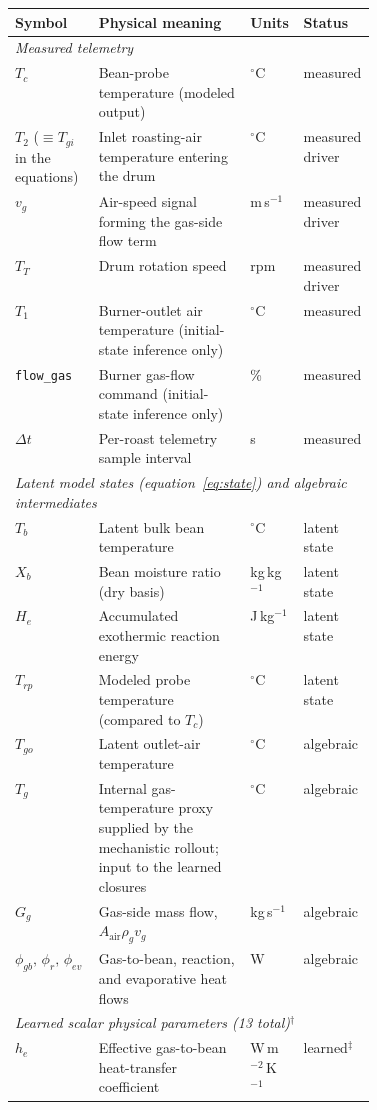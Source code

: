\documentclass[fleqn,10pt]{wlscirep}
\begin{document}
\begin{table}[!htbp]
\centering
\small
{\color{blue}
\begin{tabular}{|l|p{0.42\linewidth}|l|l|}
\hline
Symbol & Physical meaning & Units & Status \\
\hline
\multicolumn{4}{|l|}{\emph{Measured telemetry}} \\
\hline
$T_c$ & Bean-probe temperature (modeled output) & $^{\circ}$C & measured \\
$T_2$ ($\equiv T_{gi}$ in the equations) & Inlet roasting-air temperature entering the drum & $^{\circ}$C & measured driver \\
$v_g$ & Air-speed signal forming the gas-side flow term & m\,s$^{-1}$ & measured driver \\
$T_T$ & Drum rotation speed & rpm & measured driver \\
$T_1$ & Burner-outlet air temperature (initial-state inference only) & $^{\circ}$C & measured \\
\texttt{flow\_gas} & Burner gas-flow command (initial-state inference only) & \% & measured \\
$\Delta t$ & Per-roast telemetry sample interval & s & measured \\
\hline
\multicolumn{4}{|l|}{\emph{Latent model states (equation~\eqref{eq:state}) and algebraic intermediates}} \\
\hline
$T_b$ & Latent bulk bean temperature & $^{\circ}$C & latent state \\
$X_b$ & Bean moisture ratio (dry basis) & kg\,kg$^{-1}$ & latent state \\
$H_e$ & Accumulated exothermic reaction energy & J\,kg$^{-1}$ & latent state \\
$T_{rp}$ & Modeled probe temperature (compared to $T_c$) & $^{\circ}$C & latent state \\
$T_{go}$ & Latent outlet-air temperature & $^{\circ}$C & algebraic \\
$T_g$ & Internal gas-temperature proxy supplied by the mechanistic rollout; input to the learned closures & $^{\circ}$C & algebraic \\
$G_g$ & Gas-side mass flow, $A_{\mathrm{air}}\rho_g v_g$ & kg\,s$^{-1}$ & algebraic \\
$\phi_{gb},\,\phi_r,\,\phi_{ev}$ & Gas-to-bean, reaction, and evaporative heat flows & W & algebraic \\
\hline
\multicolumn{4}{|l|}{\emph{Learned scalar physical parameters (13 total)}$^{\dagger}$} \\
\hline
$h_e$ & Effective gas-to-bean heat-transfer coefficient & W\,m$^{-2}$\,K$^{-1}$ & learned$^{\ddagger}$ \\

\end{tabular}}
\end{table}
\end{document}
